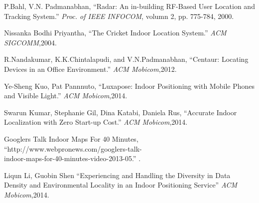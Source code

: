 \documentclass[a4paper, 11pt]{article} %
\begin{document}
\begin{thebibliography}{10}
	
P.Bahl, V.N. Padmanabhan,
``Radar: An in-building RF-Based User Location and Tracking System.''
\textit{Proc. of IEEE INFOCOM}, volumn 2, pp. 775-784, 2000.

Nissanka Bodhi Priyantha,
``The Cricket Indoor Location System.''
\textit{ACM SIGCOMM},2004.

R.Nandakumar, K.K.Chintalapudi, and V.N.Padmanabhan,
``Centaur: Locating Devices in an Office Environment.''
\textit{ACM Mobicom},2012.

Ye-Sheng Kuo, Pat Pannnuto,
``Luxapose: Indoor Positioning with Mobile Phones and Visible Light.''
\textit{ACM Mobicom},2014.

Swarun Kumar, Stephanie Gil, Dina Katabi, Daniela Rus,
``Accurate Indoor Localization with Zero Start-up Cost.''
\textit{ACM Mobicom},2014.


Googlers Talk Indoor Maps For 40 Minutes,
``http://www.webpronews.com/googlers-talk-\\indoor-maps-for-40-minutes-video-2013-05.''
\textit{}.

Liqun Li, Guobin Shen
``Experiencing and Handling the Diversity in Data Density and Environmental Locality in an Indoor Positioning Service''
\textit{ACM Mobicom},2014.

\end{thebibliography}

\end{document}
